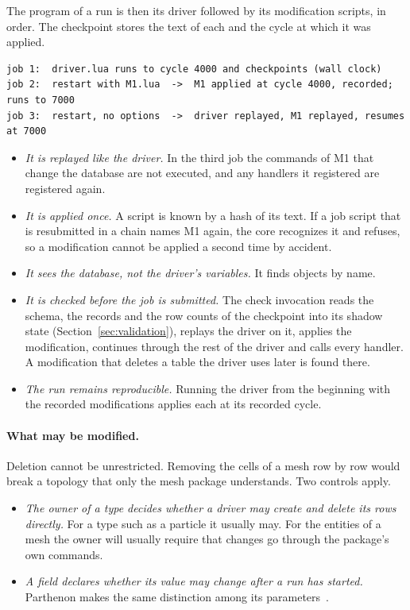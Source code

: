 \documentclass[11pt,a4paper]{article}
\begin{document}
The program of a run is then its driver followed by its modification
scripts, in order.  The checkpoint stores the text of each and the cycle at
which it was applied.

\begin{lstlisting}
job 1:  driver.lua runs to cycle 4000 and checkpoints (wall clock)
job 2:  restart with M1.lua  ->  M1 applied at cycle 4000, recorded; runs to 7000
job 3:  restart, no options  ->  driver replayed, M1 replayed, resumes at 7000
\end{lstlisting}

\begin{itemize}
  \item \emph{It is replayed like the driver.}  In the third job the
        commands of M1 that change the database are not executed, and any
        handlers it registered are registered again.
  \item \emph{It is applied once.}  A script is known by a hash of its
        text.  If a job script that is resubmitted in a chain names M1
        again, the core recognizes it and refuses, so a modification cannot
        be applied a second time by accident.
  \item \emph{It sees the database, not the driver's variables.}  It finds
        objects by name.
  \item \emph{It is checked before the job is submitted.}  The check
        invocation reads the schema, the records and the row counts of the
        checkpoint into its shadow state (Section~\ref{sec:validation}),
        replays the driver on it, applies the modification, continues
        through the rest of the driver and calls every handler.  A
        modification that deletes a table the driver uses later is found
        there.
  \item \emph{The run remains reproducible.}  Running the driver from the
        beginning with the recorded modifications applies each at its
        recorded cycle.
\end{itemize}

\paragraph{What may be modified.}  Deletion cannot be unrestricted.
Removing the cells of a mesh row by row would break a topology that only
the mesh package understands.  Two controls apply.

\begin{itemize}
  \item \emph{The owner of a type decides whether a driver may create and
        delete its rows directly.}  For a type such as a particle it
        usually may.  For the entities of a mesh the owner will usually
        require that changes go through the package's own commands.
  \item \emph{A field declares whether its value may change after a run has
        started.}  Parthenon makes the same distinction among its
        parameters~\cite{parthenondocs}.
\end{itemize}
\end{document}
